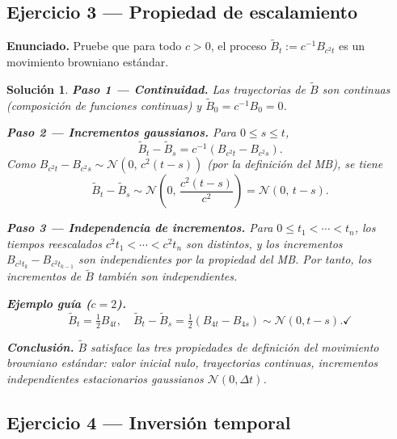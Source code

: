 \documentclass[12pt,letterpaper]{article}
\theoremstyle{ejercicio}
\theoremstyle{solucion}
\newtheorem*{solucion}{Solución}
\begin{document}
\subsection*{Ejercicio 3 — Propiedad de escalamiento}

\begin{recuadro}
\textbf{Enunciado.} Pruebe que para todo $c>0$, el proceso
$\tilde B_t := c^{-1}B_{c^2 t}$
es un movimiento browniano estándar.
\end{recuadro}

\begin{solucion}

\textbf{Paso 1 — Continuidad.} Las trayectorias de $\tilde B$ son continuas (composición de
funciones continuas) y $\tilde B_0 = c^{-1}B_0 = 0$.

\textbf{Paso 2 — Incrementos gaussianos.}
Para $0\le s\le t$,
\[
  \tilde B_t - \tilde B_s = c^{-1}(B_{c^2 t}-B_{c^2 s}).
\]
Como $B_{c^2 t}-B_{c^2 s}\sim\mathcal{N}(0,\,c^2(t-s))$ (por la definición del MB), se tiene
\[
  \tilde B_t - \tilde B_s \sim \mathcal{N}\!\left(0,\,\frac{c^2(t-s)}{c^2}\right)
  = \mathcal{N}(0,\,t-s).
\]

\textbf{Paso 3 — Independencia de incrementos.}
Para $0\le t_1<\cdots<t_n$, los tiempos reescalados $c^2 t_1<\cdots<c^2 t_n$ son distintos,
y los incrementos $B_{c^2 t_k}-B_{c^2 t_{k-1}}$ son independientes por la propiedad del MB.
Por tanto, los incrementos de $\tilde B$ también son independientes.

\textbf{Ejemplo guía ($c=2$).}
\[
  \tilde B_t = \tfrac{1}{2}B_{4t},\quad
  \tilde B_t-\tilde B_s = \tfrac{1}{2}(B_{4t}-B_{4s})\sim\mathcal{N}(0,t-s).\checkmark
\]

\textbf{Conclusión.} $\tilde B$ satisface las tres propiedades de definición del movimiento
browniano estándar: valor inicial nulo, trayectorias continuas, incrementos independientes
estacionarios gaussianos $\mathcal{N}(0,\Delta t)$.
\end{solucion}

\subsection*{Ejercicio 4 — Inversión temporal}
\end{document}
